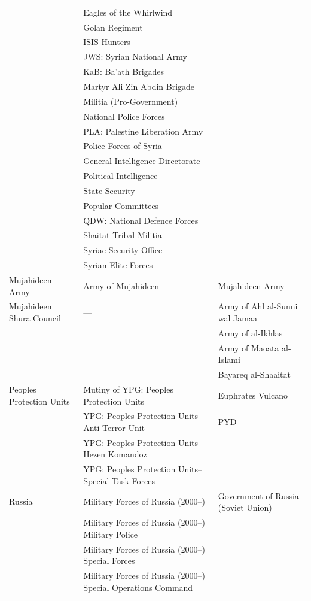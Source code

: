 \begin{longtable}{@{}>{\raggedright\arraybackslash}p{3.15cm} >{\raggedright\arraybackslash}p{6.15cm} >{\raggedright\arraybackslash}p{6.15cm}@{}}
 & Eagles of the Whirlwind &  \\
 & Golan Regiment &  \\
 & ISIS Hunters &  \\
 & JWS: Syrian National Army &  \\
 & KaB: Ba'ath Brigades &  \\
 & Martyr Ali Zin Abdin Brigade &  \\
 & Militia (Pro-Government) &  \\
 & National Police Forces &  \\
 & PLA: Palestine Liberation Army &  \\
 & Police Forces of Syria &  \\
 & General Intelligence Directorate &  \\
 & Political Intelligence &  \\
 & State Security &  \\
 & Popular Committees &  \\
 & QDW: National Defence Forces &  \\
 & Shaitat Tribal Militia &  \\
 & Syriac Security Office &  \\
 & Syrian Elite Forces &  \\
\hline
Mujahideen Army & Army of Mujahideen & Mujahideen Army \\
\hline
Mujahideen Shura Council & --- & Army of Ahl al-Sunni wal Jamaa \\
 &  & Army of al-Ikhlas \\
 &  & Army of Maoata al-Islami \\
 &  & Bayareq al-Shaaitat \\
\hline
Peoples Protection Units & Mutiny of YPG: Peoples Protection Units & Euphrates Vulcano \\
 & YPG: Peoples Protection Units--Anti-Terror Unit & PYD \\
 & YPG: Peoples Protection Units--Hezen Komandoz &  \\
 & YPG: Peoples Protection Units--Special Task Forces &  \\
\hline
Russia & Military Forces of Russia (2000--) & Government of Russia (Soviet Union) \\
 & Military Forces of Russia (2000--) Military Police &  \\
 & Military Forces of Russia (2000--) Special Forces &  \\
 & Military Forces of Russia (2000--) Special Operations Command &  \\

\end{longtable}
